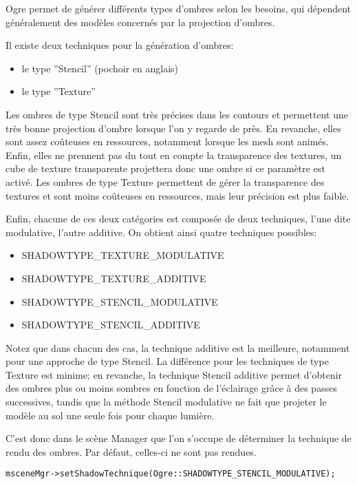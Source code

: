 Ogre permet de générer différents types d'ombres selon les besoins, qui dépendent généralement des modèles concernés par la projection d'ombres.

Il existe deux techniques pour la génération d'ombres:
\begin{itemize}
\item le type ''Stencil'' (pochoir en anglais)
\item le type ''Texture''
\end{itemize}

Les ombres de type Stencil sont très précises dans les contours et permettent une très bonne projection d'ombre lorsque l'on y regarde de près. En revanche, elles sont assez coûteuses en ressources, notamment lorsque les mesh sont animés. Enfin, elles ne prennent pas du tout en compte la transparence des textures, un cube de texture transparente projettera donc une ombre si ce paramètre est activé.
Les ombres de type Texture permettent de gérer la transparence des textures et sont moins coûteuses en ressources, mais leur précision est plus faible.

Enfin, chacune de ces deux catégories est composée de deux techniques, l'une dite modulative, l'autre additive. On obtient ainsi quatre techniques possibles:
\begin{itemize}
\item SHADOWTYPE\_TEXTURE\_MODULATIVE
\item SHADOWTYPE\_TEXTURE\_ADDITIVE
\item SHADOWTYPE\_STENCIL\_MODULATIVE
\item SHADOWTYPE\_STENCIL\_ADDITIVE
\end{itemize}


Notez que dans chacun des cas, la technique additive est la meilleure, notamment pour une approche de type Stencil. La différence pour les techniques de type Texture est minime; en revanche, la technique Stencil additive permet d'obtenir des ombres plus ou moins sombres en fonction de l'éclairage grâce à des passes successives, tandis que la méthode Stencil modulative ne fait que projeter le modèle au sol une seule fois pour chaque lumière.

C'est donc dans le scène Manager que l'on s'occupe de déterminer la technique de rendu des ombres. Par défaut, celles-ci ne sont pas rendues.
\begin{lstlisting}
msceneMgr->setShadowTechnique(Ogre::SHADOWTYPE_STENCIL_MODULATIVE);
\end{lstlisting}


